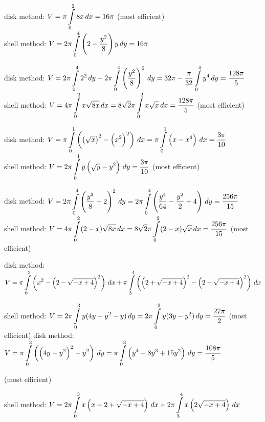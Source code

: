 \begin{Answer}
    
    \Question disk method: $V =  \pi \displaystyle \int\limits_{0}^{2} 8 x \, dx = 16\pi $ \quad (most efficient) \\
    shell method: $V = 2 \pi \displaystyle \int\limits_{0}^{4} \left(2- \dfrac{y^2}{8} \right)y \, dy = 16\pi$
    
    \Question disk method: $V =2 \pi \displaystyle \int\limits_{0}^{4} 2^2 \, dy - 2 \pi \displaystyle \int\limits_{0}^{4} \left(\dfrac{y^2}{8} \right)^2 \, dy= 32 \pi- \dfrac{\pi}{32} \displaystyle \int\limits_{0}^{4} y^4 \, dy = \dfrac{128 \pi}{5}$ \\
    shell method: $V = 4 \pi \displaystyle \int\limits_{0}^{2} x\sqrt{8x} \, dx =  8 \sqrt{2} \pi \displaystyle \int\limits_{0}^{2} x\sqrt{x} \, dx = \dfrac{128 \pi}{5} $ \quad (most efficient)
    
    \Question 
    disk method: $V = \pi \displaystyle \int\limits_{0}^{1} \left( \left(\sqrt{x} \right)^2 - \left(x^2\right)^2 \right) \, dx = \pi \displaystyle \int\limits_{0}^{1} \left( x - x^4 \right) \, dx  = \dfrac{3 \pi}{10} $  
    \\
    shell method: $V = 2 \pi \displaystyle \int\limits_{0}^{1} y \left(\sqrt{y}- y^2 \right)\, dy = \dfrac{3 \pi}{10}$ \quad (most efficient) 
    
    \Question disk method: $V = 2 \pi \displaystyle \int\limits_{0}^{4} \left(\dfrac{y^2}{8} -2 \right)^2 \, dy = 2 \pi \displaystyle \int\limits_{0}^{4} \left( \dfrac{y^4}{64}- \dfrac{y^2}{2} +4 \right) \, dy = \dfrac{256 \pi}{15}$ \\
    shell method: $V = 4 \pi \displaystyle \int\limits_{0}^{2} (2-x)\sqrt{8x} \, dx = 8\sqrt{2} \pi \displaystyle \int\limits_{0}^{2} (2-x)\sqrt{x} \, dx = \dfrac{256 \pi}{15}$ \quad (most efficient)
    
     \Question \subQuestion disk method: $V = \pi \displaystyle \int\limits _{0}^{3} \left(x^2 -  \left(2- \sqrt{-x+4}\right)^2 \right) \, dx + \pi \displaystyle \int\limits _{3}^{4} \left( \left(2+ \sqrt{-x+4}\right)^2 - \left(2- \sqrt{-x+4}\right)^2 \right) \, dx  $
    
    \par
    \hspace{0.5cm} shell method: $V = 2 \pi  \displaystyle \int\limits_{0}^{3} y(4y-y^2-y) \, dy = 2 \pi  \displaystyle \int\limits_{0}^{3} y(3y-y^2) \, dy  = \dfrac{27 \pi}{2}$ \quad (most efficient)  
    \subQuestion  disk method: $V = \pi  \displaystyle \int\limits_{0}^{3} \left(\left( 4y-y^2 \right)^2-y^2 \right) \, dy= \pi  \displaystyle \int\limits_{0}^{3} \left(y^4 - 8y^3 +15y^2 \right) \, dy = \dfrac{108 \pi}{5}$ \par
     \hfill (most efficient) \par
    \hspace{0.5cm} shell method: $V = 2 \pi  \displaystyle \int\limits_{0}^{3} x\left(x-2+\sqrt{-x+4}\right) \, dx +  2\pi \displaystyle \int\limits _{3}^{4} x \left(2\sqrt{-x+4}\right)\, dx $
    

\end{Answer}
